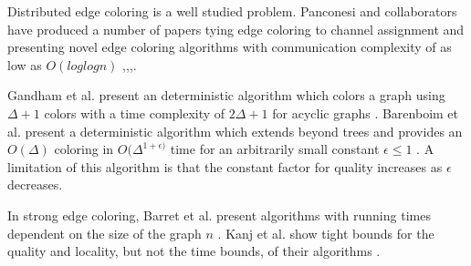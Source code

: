 Distributed edge coloring is a well studied problem. Panconesi and collaborators have produced a number of papers tying edge coloring to channel assignment and presenting novel edge coloring algorithms with communication complexity of as low as $O(log{log{n}})$ \cite{Grable:1997:NOD:314161.314266},\cite{Panconesi:1997:RDE:249364.249368},\cite{1041515},\cite{982945}.

Gandham et al. present an deterministic algorithm which colors a graph using $\Delta + 1$ colors with a time complexity of $2\Delta + 1$ for acyclic graphs \cite{1498534}. Barenboim et al. present a deterministic algorithm which extends beyond trees and provides an $O(\Delta)$ coloring in $O(\Delta^{1 + \epsilon)}$ time for an arbitrarily small constant $\epsilon \le 1$ \cite{Barenboim:2011:DDE:1993806.1993825}. A limitation of this algorithm is that the constant factor for quality increases as $\epsilon$ decreases.

In strong edge coloring, Barret et al. present algorithms with running times dependent on the size of the graph $n$ \cite{1598948}. Kanj et al. show tight bounds for the quality and locality, but not the time bounds, of their algorithms \cite{Kanj:2009:LAE:1696884.1696902}.

